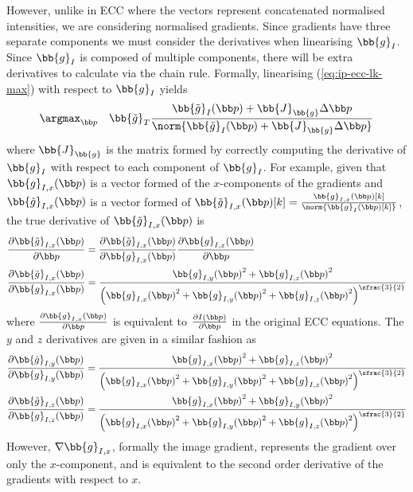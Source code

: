 However, unlike in ECC where the vectors represent concatenated normalised
intensities, we are considering normalised gradients. Since gradients have three
separate components we must consider the derivatives when linearising
$\bb{g}_I$. Since $\bb{g}_I$ is composed of multiple components, there
will be extra derivatives to calculate via the chain rule. Formally, linearising
(\ref{eq:ip-ecc-lk-max}) with respect to $\bb{g}_I$ yields
\begin{equation}\label{eq:ip-ecc-lk-linearised}
    \argmax_{\p} \quad \bb{\tilde{g}}_T \frac{\bb{\tilde{g}}_{I}(\p) + \bb{J}_{\bb{g}} \Delta \p}{\norm{{\bb{\tilde{g}}_{I}(\p) + \bb{J}_{\bb{g}} \Delta \p}}}
\end{equation}
where $\bb{J}_{\bb{g}}$ is the matrix formed by correctly computing
the derivative of $\bb{g}_{I}$ with respect to each component of
$\bb{g}_I$. For example, given that $\bb{g}_{I,x}(\p)$ is a vector
formed of the $x$-components of the gradients and $\bb{\tilde{g}}_{I,x}(\p)$
is a vector formed of $\bb{\tilde{g}}_{I,x}(\p)[k] =
\frac{\bb{g}_{I,x}(\p)[k]}{\norm{\bb{g}_{I}(\p)[k]}}$, the true
derivative of $\bb{\tilde{g}}_{I,x}(\p)$ is
\begin{equation}\label{eq:ip-ecc-chain-rule}
    \begin{aligned}
        \frac{\partial \bb{\tilde{g}}_{I,x}(\p)}{\partial \p}          &= \frac{\partial \bb{\tilde{g}}_{I,x}(\p)}{\partial \bb{g}_{I,x}(\p)} \frac{\partial \bb{g}_{I,x}(\p)}{\partial \p} \\
        \frac{\partial \bb{\tilde{g}}_{I,x}(\p)}{\partial \bb{g}_{I,x}(\p)} &= \frac{{\bb{g}_{I,y}(\p)}^2 + {\bb{g}_{I,z}(\p)}^2}{{\left({\bb{g}_{I,x}(\p)}^2 + {\bb{g}_{I,y}(\p)}^2 + {\bb{g}_{I,z}(\p)}^2 \right)}^{\sfrac{3}{2}}}
    \end{aligned}
\end{equation}
where $\frac{\partial \bb{g}_{I,x}(\p)}{\partial \p}$ is equivalent to
$\frac{\partial I(\p)}{\partial \p}$ in the original ECC equations. The $y$ and
$z$ derivatives are given in a similar fashion as
\begin{equation}\label{eq:ip-ecc-chain-rule-y-z}
    \begin{aligned}
        \frac{\partial \bb{\tilde{g}}_{I,y}(\p)}{\partial \bb{g}_{I,y}(\p)} &= \frac{{\bb{g}_{I,x}(\p)}^2 + {\bb{g}_{I,z}(\p)}^2}{{\left({\bb{g}_{I,x}(\p)}^2 + {\bb{g}_{I,y}(\p)}^2 + {\bb{g}_{I,z}(\p)}^2 \right)}^{\sfrac{3}{2}}} \\
        \frac{\partial \bb{\tilde{g}}_{I,z}(\p)}{\partial \bb{g}_{I,z}(\p)} &= \frac{{\bb{g}_{I,x}(\p)}^2 + {\bb{g}_{I,y}(\p)}^2}{{\left({\bb{g}_{I,x}(\p)}^2 + {\bb{g}_{I,y}(\p)}^2 + {\bb{g}_{I,z}(\p)}^2 \right)}^{\sfrac{3}{2}}}
    \end{aligned}
\end{equation}
However, $\nabla \bb{g}_{I,x}$, formally the image gradient, represents the
gradient over only the $x$-component, and is equivalent to the second order
derivative of the gradients with respect to $x$.

